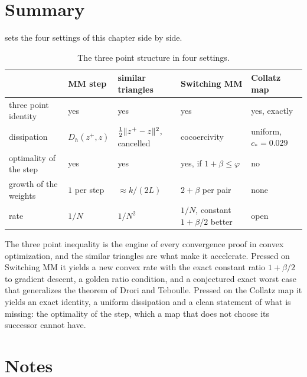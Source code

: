 \section{Summary}\label{sec:ch7b:summary}

 sets the four settings of this chapter side by side.

\begin{table}[ht]
\centering\small
\setlength{\tabcolsep}{3pt}
\caption{The three point structure in four settings.}
\label{tab:ch7b:summary}
\begin{tabular}{@{}>{\raggedright\arraybackslash}p{}>{\raggedright\arraybackslash}p{}>{\raggedright\arraybackslash}p{}>{\raggedright\arraybackslash}p{}>{\raggedright\arraybackslash}p{}@{}}
\toprule
 & MM step & similar triangles & Switching MM & Collatz map \\
\midrule
three point identity & yes & yes & yes & yes, exactly \\
dissipation & $D_h(z^+,z)$ & $\tfrac{1}{2}\|z^+-z\|^2$, cancelled & cocoercivity & uniform, $c_*=0.029$ \\
optimality of the step & yes & yes & yes, if $1+\beta\le\varphi$ & no \\
growth of the weights & $1$ per step & $\approx k/(2L)$ & $2+\beta$ per pair & none \\
rate & $1/N$ & $1/N^2$ & $1/N$, constant $1+\beta/2$ better & open \\
\bottomrule
\end{tabular}
\end{table}

The three point inequality is the engine of every convergence proof in
convex optimization, and the similar triangles are what make it accelerate.
Pressed on Switching MM it yields a new convex rate with the exact constant
ratio $1+\beta/2$ to gradient descent, a golden ratio condition, and a
conjectured exact worst case that generalizes the theorem of Drori and
Teboulle. Pressed on the Collatz map it yields an exact identity, a uniform
dissipation and a clean statement of what is missing: the optimality of the
step, which a map that does not choose its successor cannot have.

\section*{Notes}

